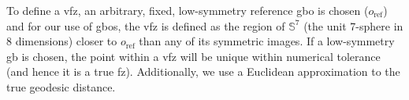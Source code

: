 \documentclass[final,twocolumn,12pt]{elsarticle}
\begin{document}
	To define a \gls{vfz}, an arbitrary, fixed, low-symmetry reference \gls{gbo} is chosen ($o_{\text{ref}}$) and for our use of \glspl{gbo}, the \gls{vfz} is defined as the region of $\mathbb{S}^7$ (the unit 7-sphere in 8 dimensions) closer to $o_{\text{ref}}$ than any of its symmetric images. %
	If a low-symmetry \gls{gb} is chosen, the point within a \gls{vfz} will be unique within numerical tolerance (and hence it is a true \gls{fz}). Additionally, we use a Euclidean approximation to the true geodesic distance.
\end{document}
